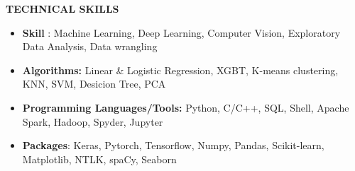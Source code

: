 \documentclass{article}
\begin{document}
 \begin{theorem}
   \vspace{-0.7mm}
\begin{center}
\textbf{ TECHNICAL SKILLS
}\end{center}  
\vspace{-0.9mm}    
   \end{theorem}
\vspace{-3 mm}
\begin{itemize}
\item \textbf {Skill} : Machine Learning, Deep Learning, Computer Vision, Exploratory Data Analysis, Data wrangling   

\item \textbf{Algorithms:} Linear \& Logistic Regression, XGBT, K-means clustering, KNN, SVM, Desicion Tree, PCA
 \item \textbf{Programming Languages/Tools:}
 Python, C/C++, SQL, Shell,  Apache Spark, Hadoop, Spyder, Jupyter
\item \textbf{Packages}: Keras, Pytorch, Tensorflow, Numpy, Pandas, Scikit-learn, Matplotlib, NTLK, spaCy, Seaborn

\end{itemize}

\vspace{-3.0mm}
\end{document}
